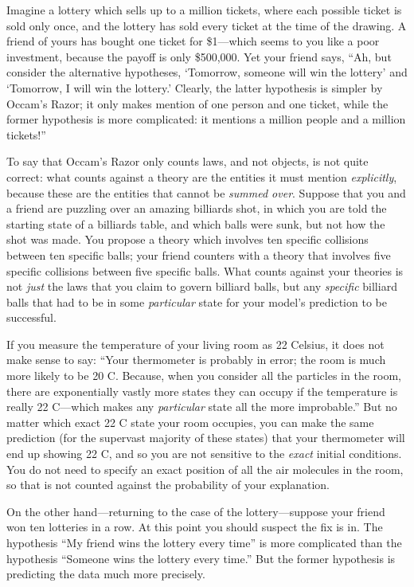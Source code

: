 {
 Imagine a lottery which sells up to a million tickets, where each
possible ticket is sold only once, and the lottery has sold every
ticket at the time of the drawing. A friend of yours has bought one
ticket for \$1---which seems to you like a poor investment, because the
payoff is only \$500,000. Yet your friend says, ``Ah,
but consider the alternative hypotheses, `Tomorrow,
someone will win the lottery' and
`Tomorrow, I will win the lottery.'
Clearly, the latter hypothesis is simpler by Occam's
Razor; it only makes mention of one person and one ticket, while the
former hypothesis is more complicated: it mentions a million people and
a million tickets!''}

{
 To say that Occam's Razor only counts laws, and
not objects, is not quite correct: what counts against a theory are the
entities it must mention \textit{explicitly}, because these are the
entities that cannot be \textit{summed over}. Suppose that you and a
friend are puzzling over an amazing billiards shot, in which you are
told the starting state of a billiards table, and which balls were
sunk, but not how the shot was made. You propose a theory which
involves ten specific collisions between ten specific balls; your
friend counters with a theory that involves five specific collisions
between five specific balls. What counts against your theories is not
\textit{just} the laws that you claim to govern billiard balls, but any
\textit{specific} billiard balls that had to be in some
\textit{particular} state for your model's prediction
to be successful.}

{
 If you measure the temperature of your living room as
22\degree{} Celsius, it does not make sense to say:
``Your thermometer is probably in error; the room is
much more likely to be 20\degree{} C. Because, when you
consider all the particles in the room, there are exponentially vastly
more states they can occupy if the temperature is really
22\degree{} C---which makes any \textit{particular} state all
the more improbable.'' But no matter which exact
22\degree{} C state your room occupies, you can make the same
prediction (for the supervast majority of these states) that your
thermometer will end up showing 22\degree{} C, and so you are
not sensitive to the \textit{exact} initial conditions. You do not need
to specify an exact position of all the air molecules in the room, so
that is not counted against the probability of your explanation.}

{
 On the other hand---returning to the case of the lottery---suppose
your friend won ten lotteries in a row. At this point you should
suspect the fix is in. The hypothesis ``My friend wins
the lottery every time'' is more complicated than the
hypothesis ``Someone wins the lottery every
time.'' But the former hypothesis is predicting the
data much more precisely.}

